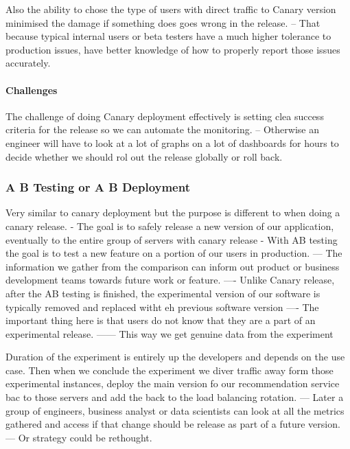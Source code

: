 \documentclass[a4paper, 11pt]{book}
\begin{document}
{    Also the ability to chose the type of users with direct traffic to Canary version minimised the damage if something does goes wrong in the release.
    -- That because typical internal users or beta testers have a much higher tolerance to production issues, have better knowledge of how to properly report those issues accurately.

    \paragraph{Challenges}
    The challenge of doing Canary deployment effectively is setting clea success criteria for the release so we can automate the monitoring.
    -- Otherwise an engineer will have to look at a lot of graphs on a lot of dashboards for hours to decide whether we should rol out the release globally or roll back.

    \subsubsection{A B Testing or A B Deployment}
    Very similar to canary deployment but the purpose is different to when doing a canary release.
    - The goal is to safely release a new version of our application, eventually to the entire group of servers with canary release
    - With AB testing the goal is to test a new feature on a portion of our users in production.
    --- The information we gather from the comparison can inform out product or business development teams towards future work or feature.
    ---- Unlike Canary release, after the AB testing is finished, the experimental version of our software is typically removed and replaced witht eh previous software version
    ---- The important thing here is that users do not know that they are a part of an experimental release.
    ------ This way we get genuine data from the experiment

    Duration of the experiment is entirely up the developers and depends on the use case.
    Then when we conclude the experiment we diver traffic away form those experimental instances, deploy the main version fo our recommendation service bac to those servers and add the back to the load balancing rotation.
    --- Later a group of engineers, business analyst or data scientists can look at all the metrics gathered and access if that change should be release as part of a future version.
    --- Or strategy could be rethought.

}
\end{document}
